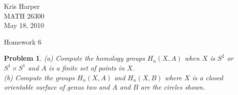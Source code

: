 \documentclass{article}
\newtheorem{problem}{Problem}
\begin{document}
\begin{flushright}
Kris Harper\\

MATH 26300\\

May 18, 2010
\end{flushright}

\begin{center}
Homework 6
\end{center}

\begin{problem}
(a) Compute the homology groups $H_n(X,A)$ when $X$ is $S^2$ or $S^1 \times S^1$ and $A$ is a finite set of points in $X$.\\
(b) Compute the groups $H_n(X,A)$ and $H_n(X,B)$ where $X$ is a closed orientable surface of genus two and $A$ and $B$ are the circles shown.
\end{problem}
\end{document}
